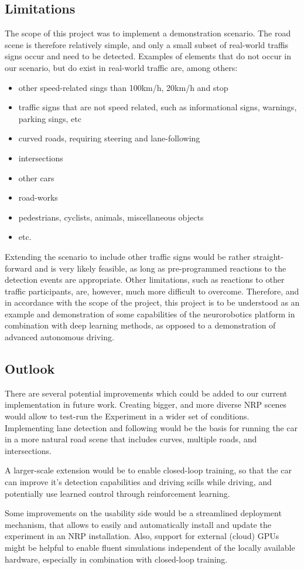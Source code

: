\subsection{Limitations}
The scope of this project was to implement a demonstration scenario. 
The road scene is therefore relatively simple, and only a small subset of real-world traffis signs occur and need to be detected. 
Examples of elements that do not occur in our scenario, but do exist in real-world traffic are, among others:
\begin{itemize}
 \item other speed-related sings than 100km/h, 20km/h and stop
 \item traffic signs that are not speed related, such as informational signs, warnings, parking sings, etc
 \item curved roads, requiring steering and lane-following
 \item intersections
 \item other cars
 \item road-works
 \item pedestrians, cyclists, animals, miscellaneous objects
 \item etc.
\end{itemize}

Extending the scenario to include other traffic signs would be rather straight-forward and is very likely feasible, as long as pre-programmed reactions to the detection events are appropriate. 
Other limitations, such as reactions to other traffic participants, are, however, much more difficult to overcome.
Therefore, and in accordance with the scope of the project, this project is to be understood as an example and demonstration of some capabilities of the neurorobotics platform in combination with deep learning methods, as opposed to a demonstration of advanced autonomous driving.

\subsection{Outlook}
There are several potential improvements which could be added to our current implementation in future work. 
Creating bigger, and more diverse NRP scenes would allow to test-run the Experiment in a wider set of conditions.
Implementing lane detection and following would be the basis for running the car in a more natural road scene that includes curves, multiple roads, and intersections. 

A larger-scale extension would be to enable closed-loop training, so that the car can improve it's detection capabilities and driving scills while driving, and potentially use learned control through reinforcement learning.

Some improvements on the usability side would be a streamlined deployment mechanism, that allows to easily and automatically install and update the experiment in an NRP installation. Also, support for external (cloud) GPUs might be helpful to enable fluent simulations independent of the locally available hardware, especially in combination with closed-loop training.
